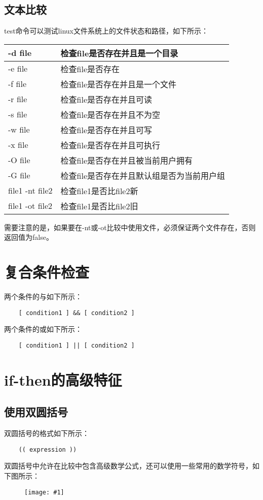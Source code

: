 \documentclass[a4paper,left=1.5cm,right=1.5cm,11pt]{article}
\newcommand{\fic}[1]{\begin{figure}[H]
		\center
		\texttt{[image: \#1]}
	\end{figure}}
\begin{document}
\subsection{文本比较}
	test命令可以测试linux文件系统上的文件状态和路径，如下所示：
	\begin{longtable}{p{2cm}p{6cm}}
	\hline
	-d file & 检查file是否存在并且是一个目录 \\
	\hline
	-e file & 检查file是否存在 \\
	\hline
	-f file & 检查file是否存在并且是一个文件 \\
	\hline
	-r file & 检查file是否存在并且可读 \\
	\hline
	-s file & 检查file是否存在并且不为空 \\
	\hline
	-w file & 检查file是否存在并且可写 \\
	\hline
	-x file & 检查file是否存在并且可执行 \\
	\hline
	-O file & 检查file是否存在并且被当前用户拥有 \\
	\hline
	-G file & 检查file是否存在并且默认组是否为当前用户组 \\
	\hline
	file1 -nt file2 & 检查file1是否比file2新 \\
	\hline
	file1 -ot file2 & 检查file1是否比file2旧 \\
	\hline
	\end{longtable}

	需要注意的是，如果要在-nt或-ot比较中使用文件，必须保证两个文件存在，否则返回值为false。

\section{复合条件检查}
	两个条件的与如下所示：
	\begin{lstlisting}
	[ condition1 ] && [ condition2 ]
	\end{lstlisting}

	两个条件的或如下所示：
	\begin{lstlisting}
	[ condition1 ] || [ condition2 ]
	\end{lstlisting}

\section{if-then的高级特征}
\subsection{使用双圆括号}
	双圆括号的格式如下所示：
	\begin{lstlisting}
	(( expression ))
	\end{lstlisting}
	双圆括号中允许在比较中包含高级数学公式，还可以使用一些常用的数学符号，如下图所示：
	\fic{3.png}
\end{document}
